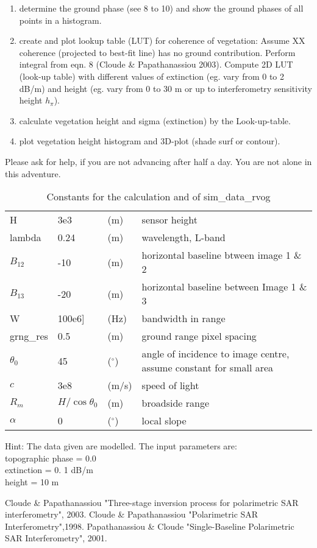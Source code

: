 \begin{enumerate}
\item determine the ground phase (see 8 to 10) and show the ground phases of all points in a histogram.
\item create and plot lookup table (LUT) for coherence of vegetation: 
Assume XX coherence (projected to best-fit line) has no ground contribution. Perform integral from eqn. 8 (Cloude \& Papathanassiou 2003). Compute 2D LUT (look-up table) with different values of extinction (eg. vary from 0 to 2 dB/m) and height (eg. vary from 0 to 30 m or up to interferometry sensitivity height $h_\pi$).
\item calculate vegetation height and sigma (extinction) by the Look-up-table.
\item plot vegetation height histogram and 3D-plot (shade surf or contour).
\end{enumerate}
Please ask for help, if you are not advancing after half a day. You are not alone in this adventure. 

\begin{table}[h]
\footnotesize
\begin{tabular}{l@{= }lll}
H & 3e3 & (m) & sensor height\\
lambda & 0.24 & (m) & wavelength, L-band\\
$B_{12}$ & -10 & (m)  & horizontal baseline btween image 1 \& 2\\
$B_{13}$ & -20 & (m) & horizontal baseline between Image 1 \& 3\\
W  & 100e6] & (Hz) & bandwidth in range\\
grng\_res & 0.5 & (m) & ground range pixel spacing\\
$\theta_0$ & 45 & ($^\circ$)  & angle of incidence to image centre, assume constant for small area\\
$c$ & 3e8 & (m/s) & speed of light\\
$R_m$ & $H/\cos\theta_0$ & (m) & broadside range\\
$\alpha$ &  0  & ($^\circ$)& local slope\\
\end{tabular}
\caption{Constants for the calculation and of sim\_data\_rvog}
\end{table}
\noindent Hint: The data given are modelled. The input parameters are:\\
topographic phase = 0.0\\
extinction = 0. 1 dB/m\\
height = 10 m\\

\begin{thebibliography}{123}
 Cloude \& Papathanassiou "Three-stage inversion process for polarimetric SAR interferometry", 2003.
 Cloude \& Papathanassiou "Polarimetric SAR Interferometry",1998.
 Papathanassiou \& Cloude "Single-Baseline Polarimetric SAR Interferometry", 2001.
\end{thebibliography}
